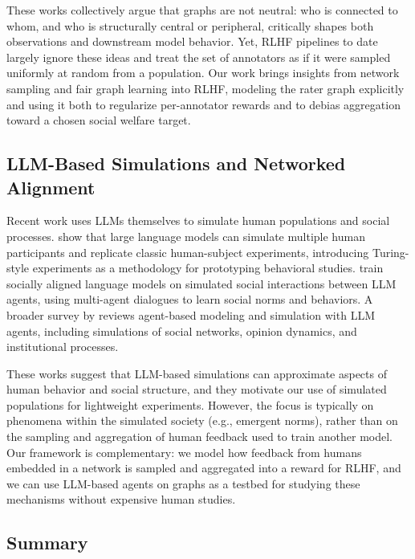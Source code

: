 \documentclass{article}
\theoremstyle{plain}
\theoremstyle{definition}
\theoremstyle{remark}
\begin{document}
These works collectively argue that graphs are not neutral: who is connected to whom, and who is structurally central or peripheral, critically shapes both observations and downstream model behavior.
Yet, RLHF pipelines to date largely ignore these ideas and treat the set of annotators as if it were sampled uniformly at random from a population.
Our work brings insights from network sampling and fair graph learning into RLHF, modeling the rater graph explicitly and using it both to regularize per-annotator rewards and to debias aggregation toward a chosen social welfare target.

\subsection{LLM-Based Simulations and Networked Alignment}
\label{sec:rw_simulation}

Recent work uses LLMs themselves to simulate human populations and social processes.
\citet{aher2023turingexperiments} show that large language models can simulate multiple human participants and replicate classic human-subject experiments, introducing Turing-style experiments as a methodology for prototyping behavioral studies.
\citet{liu2023socially_aligned} train socially aligned language models on simulated social interactions between LLM agents, using multi-agent dialogues to learn social norms and behaviors.
A broader survey by \citet{gao2024llm_abm_survey} reviews agent-based modeling and simulation with LLM agents, including simulations of social networks, opinion dynamics, and institutional processes.

These works suggest that LLM-based simulations can approximate aspects of human behavior and social structure, and they motivate our use of simulated populations for lightweight experiments.
However, the focus is typically on phenomena within the simulated society (e.g., emergent norms), rather than on the sampling and aggregation of human feedback used to train another model.
Our framework is complementary: we model how feedback from humans embedded in a network is sampled and aggregated into a reward for RLHF, and we can use LLM-based agents on graphs as a testbed for studying these mechanisms without expensive human studies.

\subsection{Summary}
\end{document}

